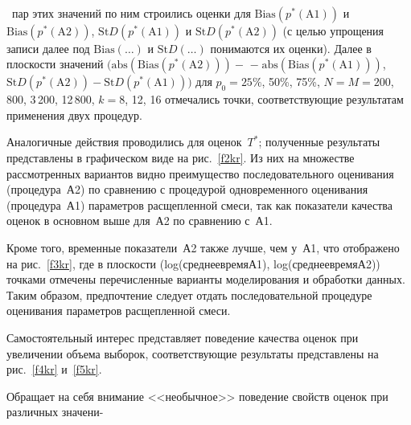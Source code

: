      \begin{figure}[b] %
\vspace*{1pt}
\begin{center}
\mbox{%
\epsfxsize=160.172mm
}
\end{center}
\vspace*{-9pt}
     \end{figure}


\begin{multicols}{2}

~пар этих 
значений по ним строились оценки для $\mathrm{Bias}(p^*(\mathrm{A1}))$ и 
$\mathrm{Bias}(p^*(\mathrm{A2}))$, $\mathrm{St}D(p^*(\mathrm{A1}))$ и 
$\mathrm{St}D(p^*(\mathrm{A2}))$ (с целью упрощения записи далее под $\mathrm{Bias}(\ldots)$ 
и $\mathrm{St}D(\ldots)$ понимаются их оценки). Далее в плоскости значений 
$(\mathrm{abs}(\mathrm{Bias}(p^*(\mathrm{A2}))) -$ %
$-\;\mathrm{abs}(\mathrm{Bias}(p^*(\mathrm{A1})))$, $\mathrm{St}D(p^*(\mathrm{A2})) - 
\mathrm{St}D(p^*(\mathrm{A1})))$ для $p_0 = 25\%$, 50\%, 75\%, $N = M = 200$, 800, 
3\,200, 12\,800, $k = 8$, 12, 16 отмечались точки, соответствующие результатам 
применения двух процедур. 
{%

}

Аналогичные действия проводились для 
оценок~$T^*$; полученные результаты представлены в графическом виде на 
рис.~\ref{f2kr}. Из них на множестве рассмотренных вариантов видно 
преимущество последовательного оценивания (процедура~А2) по сравнению с 
процедурой одновременного оценивания (процедура~А1) параметров %
расщепленной смеси, так как показатели качества оценок в основном выше 
для~А2 по сравнению с~А1.
{%

}


     Кроме того, временные показатели~А2 также лучше, чем у~А1, что 
отображено на рис.~\ref{f3kr}, где в плоскости (log(сред\-нее\;вре\-мя\;А1), 
log(сред\-нее\;вре\-мя\;А2)) точками отмечены перечисленные варианты 
моделирования и обработки данных. Таким образом, предпочтение следует отдать 
последовательной процедуре оценивания параметров расщепленной смеси.

     

    
     Самостоятельный интерес представляет поведение качества оценок при 
увеличении объема выборок, соответствующие результаты представлены на 
рис.~\ref{f4kr} и~\ref{f5kr}. 

    
     Обращает на себя внимание <<необычное>> поведение свойств оценок при 
различных значени-\linebreak 
\vspace*{-12pt}
\pagebreak
\end{multicols}

